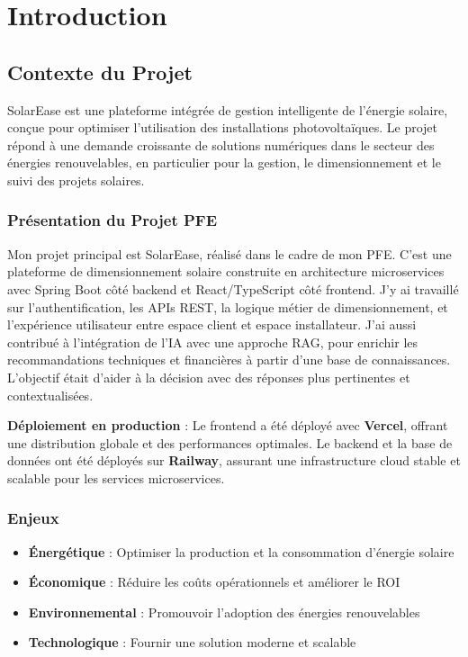 \documentclass[12pt,a4paper,french]{report}
\begin{document}
\cleardoublepage
\tableofcontents
\cleardoublepage

\chapter{Introduction}

\section{Contexte du Projet}

SolarEase est une plateforme intégrée de gestion intelligente de l'énergie solaire, conçue pour optimiser l'utilisation des installations photovoltaïques. Le projet répond à une demande croissante de solutions numériques dans le secteur des énergies renouvelables, en particulier pour la gestion, le dimensionnement et le suivi des projets solaires.

\subsection{Présentation du Projet PFE}

Mon projet principal est SolarEase, réalisé dans le cadre de mon PFE. C'est une plateforme de dimensionnement solaire construite en architecture microservices avec Spring Boot côté backend et React/TypeScript côté frontend. J'y ai travaillé sur l'authentification, les APIs REST, la logique métier de dimensionnement, et l'expérience utilisateur entre espace client et espace installateur. J'ai aussi contribué à l'intégration de l'IA avec une approche RAG, pour enrichir les recommandations techniques et financières à partir d'une base de connaissances. L'objectif était d'aider à la décision avec des réponses plus pertinentes et contextualisées.

\textbf{Déploiement en production} : Le frontend a été déployé avec \textbf{Vercel}, offrant une distribution globale et des performances optimales. Le backend et la base de données ont été déployés sur \textbf{Railway}, assurant une infrastructure cloud stable et scalable pour les services microservices.

\subsection{Enjeux}

\begin{itemize}
    \item \textbf{Énergétique} : Optimiser la production et la consommation d'énergie solaire
    \item \textbf{Économique} : Réduire les coûts opérationnels et améliorer le ROI
    \item \textbf{Environnemental} : Promouvoir l'adoption des énergies renouvelables
    \item \textbf{Technologique} : Fournir une solution moderne et scalable
\end{itemize}
\end{document}
